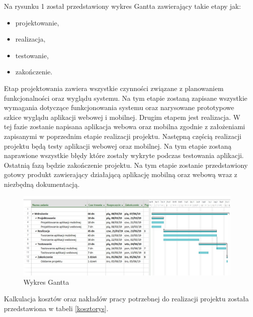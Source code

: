 \documentclass[12pt]{article}
\begin{document}
\noindent Na rysunku 1 został przedstawiony wykres Gantta zawierający takie etapy jak: 
\begin{itemize}
\item projektowanie,
\item realizacja,
\item testowanie,
\item zakończenie.
\end{itemize}

Etap projektowania zawiera wszystkie czynności związane z planowaniem funkcjonalności oraz wyglądu systemu. Na tym etapie zostaną zapisane wszystkie wymagania dotyczące funkcjonowania systemu oraz narysowane prototypowe szkice wyglądu aplikacji webowej i mobilnej.
Drugim etapem jest realizacja. W tej fazie zostanie napisana aplikacja webowa oraz mobilna zgodnie z założeniami zapisanymi w poprzednim etapie realizacji projektu. Następną częścią realizacji projektu będą testy aplikacji webowej oraz mobilnej.  Na tym etapie zostaną naprawione wszystkie błędy które zostały wykryte podczas testowania aplikacji. Ostatnią fazą będzie zakończenie projektu. Na tym etapie zostanie przedstawiony gotowy produkt zawierający działającą aplikację mobilną oraz webową wraz z niezbędną dokumentacją. 
	\begin{figure}[H]
		\centering
		\includegraphics[scale=0.75, angle=270]{wykres_ganttaV3.png}
		\caption{Wykres Gantta}
	\end{figure}
	

Kalkulacja kosztów oraz nakładów pracy potrzebnej do realizacji projektu została przedstawiona w tabeli \ref{kosztorys}.
\end{document}
